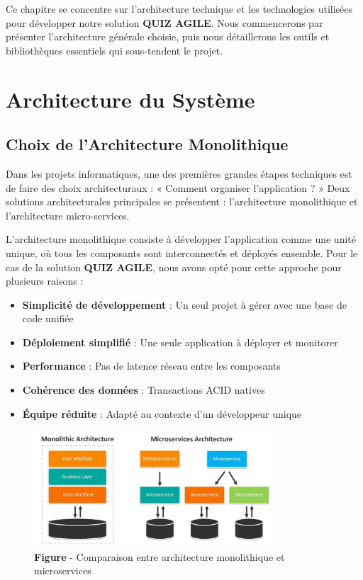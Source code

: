 \documentclass[12pt,a4paper,twoside,openright]{report}
\begin{document}
Ce chapitre se concentre sur l'architecture technique et les technologies utilisées pour développer notre solution \textbf{QUIZ AGILE}. Nous commencerons par présenter l'architecture générale choisie, puis nous détaillerons les outils et bibliothèques essentiels qui sous-tendent le projet.

\section{Architecture du Système}

\subsection{Choix de l'Architecture Monolithique}

Dans les projets informatiques, une des premières grandes étapes techniques est de faire des choix architecturaux : « Comment organiser l'application ? » Deux solutions architecturales principales se présentent : l'architecture monolithique et l'architecture micro-services.

L'architecture monolithique consiste à développer l'application comme une unité unique, où tous les composants sont interconnectés et déployés ensemble. Pour le cas de la solution \textbf{QUIZ AGILE}, nous avons opté pour cette approche pour plusieurs raisons :

\begin{itemize}
\item \textbf{Simplicité de développement} : Un seul projet à gérer avec une base de code unifiée
\item \textbf{Déploiement simplifié} : Une seule application à déployer et monitorer
\item \textbf{Performance} : Pas de latence réseau entre les composants
\item \textbf{Cohérence des données} : Transactions ACID natives
\item \textbf{Équipe réduite} : Adapté au contexte d'un développeur unique
\end{itemize}

\begin{figure}[H]
\centering
\includegraphics[width=0.8\textwidth]{latex_media/media/image15.jpeg}
\caption{\textbf{Figure \thefigure} - Comparaison entre architecture monolithique et microservices}
\label{fig:comparaison-architectures}
\end{figure}
\end{document}
